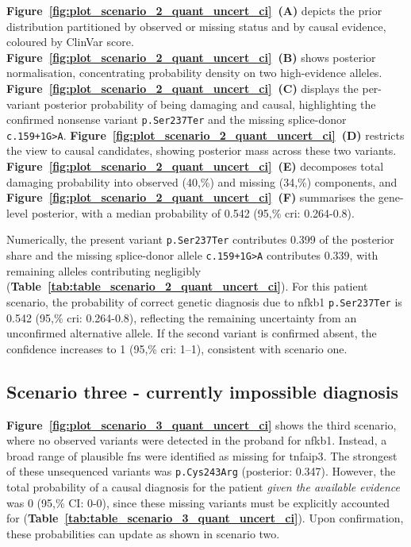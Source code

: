 \textbf{Figure~\ref{fig:plot_scenario_2_quant_uncert_ci}~(A)} depicts the prior distribution partitioned by observed or missing status and by causal evidence, coloured by ClinVar score. \textbf{Figure~\ref{fig:plot_scenario_2_quant_uncert_ci}~(B)} shows posterior normalisation, concentrating probability density on two high-evidence alleles. \textbf{Figure~\ref{fig:plot_scenario_2_quant_uncert_ci}~(C)} displays the per-variant posterior probability of being damaging and causal, highlighting the confirmed nonsense variant \texttt{p.Ser237Ter} and the missing splice-donor \texttt{c.159+1G{\small\textgreater}A}. \textbf{Figure~\ref{fig:plot_scenario_2_quant_uncert_ci}~(D)} restricts the view to causal candidates, showing posterior mass across these two variants. \textbf{Figure~\ref{fig:plot_scenario_2_quant_uncert_ci}~(E)} decomposes total damaging probability into observed (40,\%) and missing (34,\%) components, and \textbf{Figure~\ref{fig:plot_scenario_2_quant_uncert_ci}~(F)} summarises the gene-level posterior, with a median probability of 0.542 (95,\% \ac{cri}: 0.264-0.8).

Numerically, the present variant \texttt{p.Ser237Ter} contributes 0.399 of the posterior share and the missing splice-donor allele \texttt{c.159+1G{\small\textgreater}A} contributes 0.339, with remaining alleles contributing negligibly (\textbf{Table~\ref{tab:table_scenario_2_quant_uncert_ci}}). For this patient scenario, the probability of correct genetic diagnosis due to \ac{nfkb1} \texttt{p.Ser237Ter} is 0.542 (95,\% \ac{cri}: 0.264-0.8), reflecting the remaining uncertainty from an unconfirmed alternative allele. If the second variant is confirmed absent, the confidence increases to 1 (95,\% \ac{cri}: 1–1), consistent with scenario one.



\FloatBarrier
\subsection{Scenario three - currently impossible diagnosis}

\textbf{Figure~\ref{fig:plot_scenario_3_quant_uncert_ci}} shows the third scenario, where no observed variants were detected in the proband for \ac{nfkb1}. Instead, a broad range of plausible \ac{fn}s were identified as missing for \ac{tnfaip3}. The strongest of these unsequenced variants was \texttt{p.Cys243Arg} (posterior: 0.347). However, the total probability of a causal diagnosis for the patient \emph{given the available evidence} was 0 (95,\% CI: 0-0), since these missing variants must be explicitly accounted for (\textbf{Table~\ref{tab:table_scenario_3_quant_uncert_ci}}). Upon confirmation, these probabilities can update as shown in scenario two.

